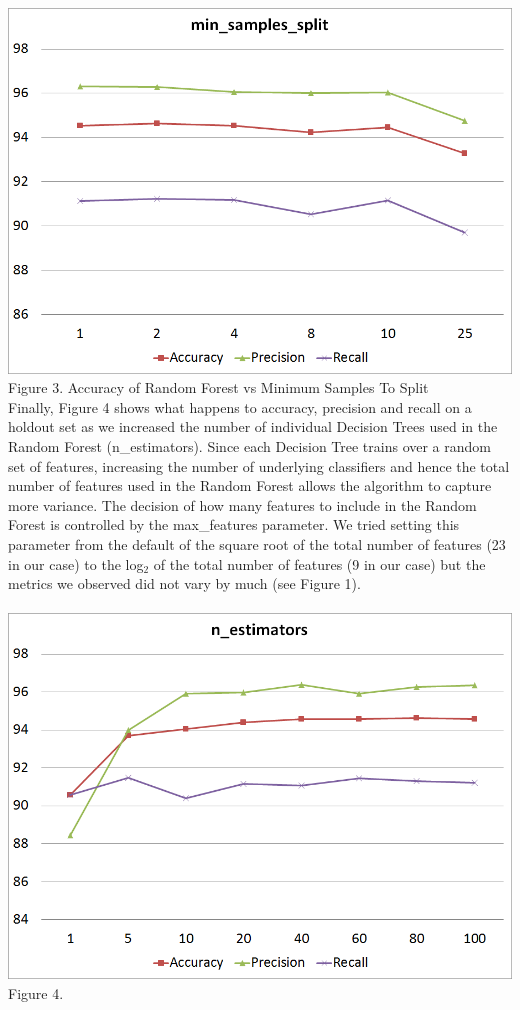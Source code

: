 \documentclass[twoside,11pt]{homework}
\begin{document}
\includegraphics[scale=0.5]{min_split.png}
\\
Figure 3. Accuracy of Random Forest vs Minimum Samples To Split
\\

Finally, Figure 4 shows what happens to accuracy, precision and recall on a holdout set as we increased the 
number of individual Decision Trees used in the Random Forest (n\_estimators). Since each Decision Tree trains
over a random set of features, increasing the number of underlying classifiers and hence the total number of features
used in the Random Forest allows the algorithm to capture more variance. The decision of how many features to include
in the Random Forest is controlled by the max\_features parameter. We tried setting this parameter from the default of the square
root of the total number of features (23 in our case) to the log$_2$ of the total number of features (9 in our case)
but the metrics we observed did not vary by much (see Figure 1). 
\\
\\
\includegraphics[scale=0.5]{n_estimators.png}
\\
Figure 4.
\\
\end{document}
